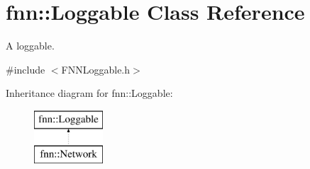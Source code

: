 \hypertarget{classfnn_1_1_loggable}{}\section{fnn\+:\+:Loggable Class Reference}
\label{classfnn_1_1_loggable}


A loggable.  




{\ttfamily \#include $<$F\+N\+N\+Loggable.\+h$>$}

Inheritance diagram for fnn\+:\+:Loggable\+:\begin{figure}[H]
\begin{center}
\leavevmode
\includegraphics[height=2.000000cm]{classfnn_1_1_loggable}
\end{center}
\end{figure}
